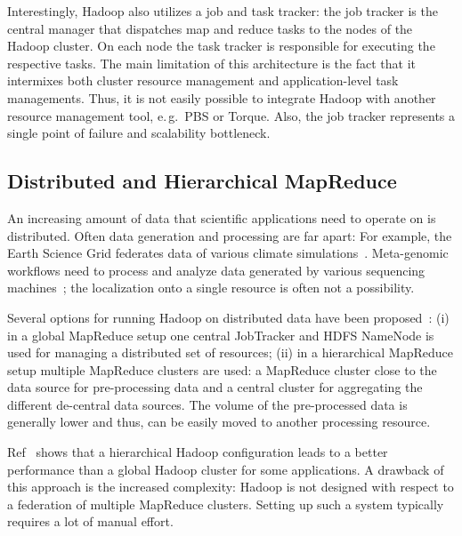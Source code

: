 \documentclass{sig-alternate}
\newcommand{\jhanote}[1]{ {\textcolor{red} { ***SJ: #1 }}}
\newcommand{\alnote}[1]{ {\textcolor{blue} { ***andreL: #1 }}}
\newcommand{\pnote}[1]{ {\textcolor{magenta} { ***pradeep: #1 }}}
\newcommand{\alnote}[1]{}
\newcommand{\pnote}[1]{}
\newcommand{\jhanote}[1]{}
\newcommand{\upp}{\vspace*{-0.5em}}
\begin{document}
Interestingly, Hadoop also utilizes a job and task tracker: the job
tracker is the central manager that dispatches map and reduce tasks to
the nodes of the Hadoop cluster. On each node the task tracker is
responsible for executing the respective tasks. The main limitation of
this architecture is the fact that it intermixes both cluster resource
management and application-level task managements. Thus, it is not
easily possible to integrate Hadoop with another resource management
tool, e.\,g.\ PBS or Torque. Also, the job tracker represents a single
point of failure and scalability bottleneck.


\upp
\subsection{Distributed and Hierarchical MapReduce}
\label{sec:pmr-distributed}%

An increasing amount of data that scientific applications need to
operate on is distributed. Often data generation
and processing are far apart: For example, the Earth Science Grid
federates data of various climate simulations~\cite{ESG}. Meta-genomic
workflows need to process and analyze data generated by various
sequencing machines~\cite{Jha:2011fk}; the localization onto a single
resource is often not a possibility.

Several options for running Hadoop on distributed data have been
proposed~\cite{weissman-mr-11}: (i) in a global MapReduce setup one
central JobTracker and HDFS NameNode is used for managing a
distributed set of resources; (ii) in a hierarchical MapReduce setup
multiple MapReduce clusters are used: a MapReduce cluster close to the
data source for pre-processing data and a central cluster for
aggregating the different de-central data sources. The volume of the
pre-processed data is generally lower and thus, can be easily moved to
another processing resource. 

Ref~\cite{weissman-mr-11} shows that a hierarchical Hadoop
configuration leads to a better performance than a global Hadoop
cluster for some applications. A drawback of this approach is the
increased complexity: Hadoop is not designed with respect to a
federation of multiple MapReduce clusters. Setting up such a system
typically requires a lot of manual effort.


  

\end{document}
